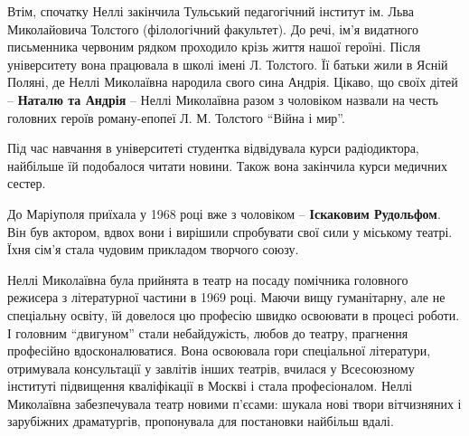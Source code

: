 Втім, спочатку Неллі закінчила Тульський педагогічний інститут ім. Льва
Миколайовича Толстого (філологічний факультет). До речі, ім'я видатного
письменника червоним рядком проходило крізь життя нашої героїні. Після
університету вона працювала в школі імені Л. Толстого. Її батьки жили в Ясній
Поляні, де Неллі Миколаївна народила свого сина Андрія. Цікаво, що своїх дітей
– \textbf{Наталю та Андрія} – Неллі Миколаївна разом з чоловіком назвали на честь
головних героїв роману-епопеї Л. М. Толстого \enquote{Війна і мир}.

Під час навчання в університеті студентка відвідувала курси радіодиктора,
найбільше їй подобалося читати новини. Також вона закінчила курси медичних
сестер.

До Маріуполя приїхала у 1968 році вже з чоловіком – \textbf{Іскаковим Рудольфом}. Він
був актором, вдвох вони і вирішили спробувати свої сили у міському театрі. Їхня
сім'я стала чудовим прикладом творчого союзу.


Неллі Миколаївна була прийнята в театр на посаду помічника головного режисера з
літературної частини в 1969 році. Маючи вищу гуманітарну, але не спеціальну
освіту, їй довелося цю професію швидко освоювати в процесі роботи. І головним
\enquote{двигуном} стали небайдужість, любов до театру, прагнення професійно
вдосконалюватися. Вона освоювала гори спеціальної літератури, отримувала
консультації у завлітів інших театрів, вчилася у Всесоюзному інституті
підвищення кваліфікації в Москві і стала професіоналом. Неллі Миколаївна
забезпечувала театр новими п'єсами: шукала нові твори вітчизняних і зарубіжних
драматургів, пропонувала для постановки найбільш вдалі. 
